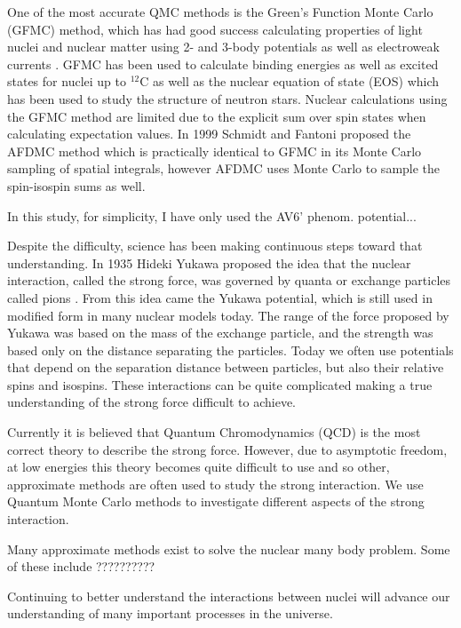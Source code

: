 One of the most accurate QMC methods is the Green's Function Monte Carlo (GFMC) method, which has had good success calculating properties of light nuclei and nuclear matter using 2- and 3-body potentials as well as electroweak currents \cite{carlson2015}. GFMC has been used to calculate binding energies as well as excited states for nuclei up to $^{12}$C as well as the nuclear equation of state (EOS) which has been used to study the structure of neutron stars. Nuclear calculations using the GFMC method are limited due to the explicit sum over spin states when calculating expectation values. In 1999 Schmidt and Fantoni \cite{schmidt1999} proposed the AFDMC method which is practically identical to GFMC in its Monte Carlo sampling of spatial integrals, however AFDMC uses Monte Carlo to sample the spin-isospin sums as well.


In this study, for simplicity, I have only used the AV6' phenom. potential...

Despite the difficulty, science has been making continuous steps toward that understanding. In 1935 Hideki Yukawa proposed the idea that the nuclear interaction, called the strong force, was governed by quanta or exchange particles called pions \cite{yukawa1935}. From this idea came the Yukawa potential, which is still used in modified form in many nuclear models today. The range of the force proposed by Yukawa was based on the mass of the exchange particle, and the strength was based only on the distance separating the particles. Today we often use potentials that depend on the separation distance between particles, but also their relative spins and isospins. These interactions can be quite complicated making a true understanding of the strong force difficult to achieve.

Currently it is believed that Quantum Chromodynamics (QCD) is the most correct theory to describe the strong force. However, due to asymptotic freedom, at low energies this theory becomes quite difficult to use and so other, approximate methods are often used to study the strong interaction. We use Quantum Monte Carlo methods to investigate different aspects of the strong interaction.

Many approximate methods exist to solve the nuclear many body problem. Some of these include ??????????

Continuing to better understand the interactions between nuclei will advance our understanding of many important processes in the universe.
